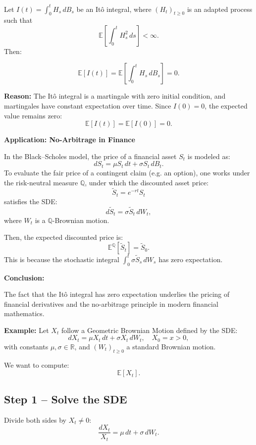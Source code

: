 
Let \( I(t) = \int_0^t H_s \, dB_s \) be an Itô integral, where \( (H_t)_{t \geq 0} \) is an adapted process such that
\[
\mathbb{E} \left[ \int_0^t H_s^2 \, ds \right] < \infty.
\]
Then:

\[
\mathbb{E}[I(t)] = \mathbb{E} \left[ \int_0^t H_s \, dB_s \right] = 0.
\]

\textbf{Reason:}  
The Itô integral is a martingale with zero initial condition, and martingales have constant expectation over time. Since \( I(0) = 0 \), the expected value remains zero:
\[
\mathbb{E}[I(t)] = \mathbb{E}[I(0)] = 0.
\]

\vspace{1em}
\textbf{Application: No-Arbitrage in Finance}

In the Black–Scholes model, the price of a financial asset \( S_t \) is modeled as:
\[
dS_t = \mu S_t \, dt + \sigma S_t \, dB_t.
\]
To evaluate the fair price of a contingent claim (e.g. an option), one works under the risk-neutral measure \( \mathbb{Q} \), under which the discounted asset price:
\[
\tilde{S}_t = e^{-rt} S_t
\]
satisfies the SDE:
\[
d\tilde{S}_t = \sigma \tilde{S}_t \, dW_t,
\]
where \( W_t \) is a \( \mathbb{Q} \)-Brownian motion.

Then, the expected discounted price is:
\[
\mathbb{E}^{\mathbb{Q}}[\tilde{S}_t] = \tilde{S}_0.
\]
This is because the stochastic integral \( \int_0^t \sigma \tilde{S}_s \, dW_s \) has zero expectation.

\textbf{Conclusion:}  


The fact that the Itô integral has zero expectation underlies the pricing of financial derivatives and the no-arbitrage principle in modern financial mathematics.


\textbf{Example:} Let \( X_t \) follow a Geometric Brownian Motion defined by the SDE:
\[
dX_t = \mu X_t\,dt + \sigma X_t\,dW_t, \quad X_0 = x > 0,
\]
with constants \( \mu, \sigma \in \mathbb{R} \), and \( (W_t)_{t \ge 0} \) a standard Brownian motion.

We want to compute:
\[
\mathbb{E}[X_t].
\]

\subsection*{Step 1 – Solve the SDE}

Divide both sides by \( X_t \neq 0 \):
\[
\frac{dX_t}{X_t} = \mu\,dt + \sigma\,dW_t.
\]

